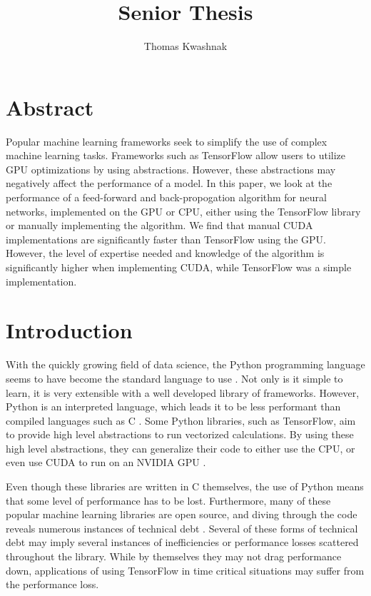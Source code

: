 \documentclass[12pt]{article}
\author{Thomas Kwashnak}
\title{Senior Thesis}
\newcommand{\CC}{C\nolinebreak\hspace{-.05em}\raisebox{.4ex}{\tiny\bf +}\nolinebreak\hspace{-.10em}\raisebox{.4ex}{\tiny\bf +} }
\begin{document}
\maketitle

\newpage

\newpage

\section{Abstract}

Popular machine learning frameworks seek to simplify the use of complex machine learning tasks.
Frameworks such as TensorFlow allow users to utilize GPU optimizations by using abstractions.
However, these abstractions may negatively affect the performance of a model.
In this paper, we look at the performance of a feed-forward and back-propogation algorithm for neural networks, implemented on the GPU or CPU, either using the TensorFlow library or manually implementing the algorithm.
We find that manual CUDA implementations are significantly faster than TensorFlow using the GPU.
However, the level of expertise needed and knowledge of the algorithm is significantly higher when implementing CUDA, while TensorFlow was a simple implementation.


\section{Introduction}

With the quickly growing field of data science, the Python programming language seems to have become the standard language to use \cite{article_python_growing_language}.
Not only is it simple to learn, it is very extensible with a well developed library of frameworks.
However, Python is an interpreted language, which leads it to be less performant than compiled languages such as \CC \cite{article_compiled_interpreted_hybrid_languages}. 
Some Python libraries, such as TensorFlow, aim to provide high level abstractions to run vectorized calculations.
By using these high level abstractions, they can generalize their code to either use the CPU, or even use CUDA \cite{lib_cuda} to run on an NVIDIA GPU \cite{lib_tensorflow}.

Even though these libraries are written in \CC themselves, the use of Python means that some level of performance has to be lost.
Furthermore, many of these popular machine learning libraries are open source, and diving through the code reveals numerous instances of technical debt \cite{article_deep_learning_framework_debt}.
Several of these forms of technical debt may imply several instances of inefficiencies or performance losses scattered throughout the library.
While by themselves they may not drag performance down, applications of using TensorFlow in time critical situations may suffer from the performance loss.
\end{document}
